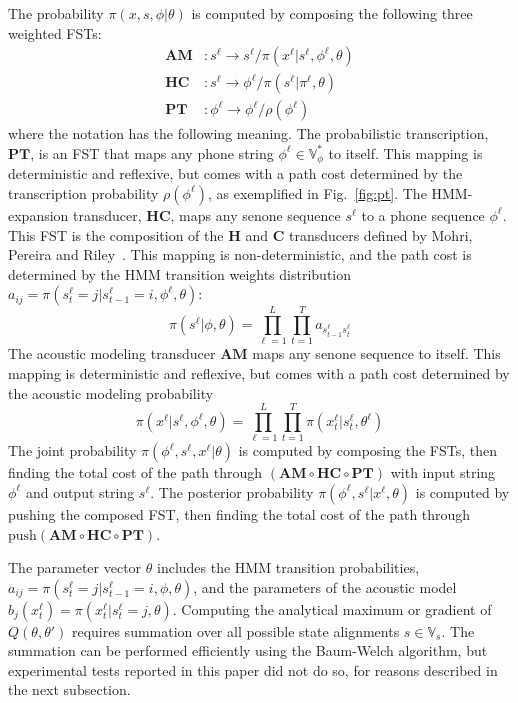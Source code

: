 The probability $\pi(x,s,\phi|\theta)$ is computed by composing the
following three weighted FSTs:
\begin{align}
  \mathbf{AM}&:s^\ell\rightarrow s^\ell/ \pi(x^\ell|s^\ell,\phi^\ell,\theta)\\
  \mathbf{HC}&:s^\ell\rightarrow \phi^\ell/ \pi(s^\ell|\pi^\ell,\theta)\\
  \mathbf{PT}&:\phi^\ell\rightarrow\phi^\ell/ \rho(\phi^\ell)
\end{align}
where the notation has the following meaning.  The probabilistic
transcription, $\mathbf{PT}$, is an FST that maps any phone string
$\phi^\ell\in\mathbb{V}_\phi^*$ to itself.  This mapping is
deterministic and reflexive, but comes with a path cost determined by
the transcription probability $\rho(\phi^\ell)$, as exemplified in
Fig.~\ref{fig:pt}.  The HMM-expansion transducer, $\mathbf{HC}$, maps
any senone sequence $s^\ell$ to a phone sequence $\phi^\ell$.  This
FST is the composition of the $\mathbf{H}$ and $\mathbf{C}$
transducers defined by Mohri, Pereira and Riley~\cite{Mohri2002}.
This mapping is non-deterministic, and the path cost is determined by
the HMM transition weights distribution $a_{ij}=\pi(s_t^\ell
=j|s_{t-1}^\ell =i,\phi^\ell,\theta)$:
\begin{equation}
  \pi(s^\ell|\phi,\theta)=\prod_{\ell=1}^L\prod_{t=1}^T
  a_{s_{t-1}^\ell s_t^\ell}
\end{equation}
The acoustic modeling transducer $\mathbf{AM}$ maps any senone sequence
to itself.  This mapping is deterministic and reflexive, but comes
with a path cost determined by the acoustic modeling probability
\begin{equation}
  \pi(x^\ell|s^\ell,\phi^\ell,\theta)=\prod_{\ell=1}^L\prod_{t=1}^T
  \pi(x_t^\ell|s_t^\ell,\theta^\ell)
\end{equation}
The joint probability $\pi(\phi^\ell,s^\ell,x^\ell|\theta)$ is
computed by composing the FSTs, then finding the total cost of the
path through
$\left(\mathbf{AM}\circ\mathbf{HC}\circ\mathbf{PT}\right)$ with input
string $\phi^\ell$ and output string $s^\ell$.  The posterior
probability $\pi(\phi^\ell,s^\ell|x^\ell,\theta)$ is computed by
pushing the composed FST, then finding the total cost of the path
through
$\textrm{push}\left(\mathbf{AM}\circ\mathbf{HC}\circ\mathbf{PT}\right)$.

The parameter vector $\theta$ includes the HMM transition
probabilities, $a_{ij}=\pi(s_t^\ell =j|s_{t-1}^\ell =i,\phi,\theta)$,
and the parameters of the acoustic model
$b_j(x_t^\ell)=\pi(x_t^\ell|s_t^\ell=j,\theta)$.
Computing the analytical maximum or gradient of
$Q\left(\theta,\theta'\right)$ requires summation over all possible
state alignments $s\in\mathbb{V}_s$.  The summation can be performed
efficiently using the Baum-Welch algorithm, but experimental tests
reported in this paper did not do so, for reasons described in the
next subsection.
